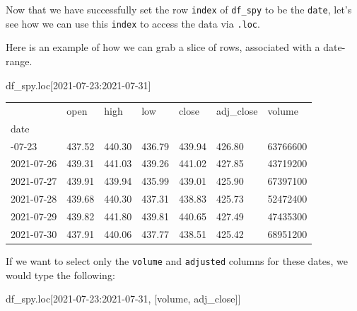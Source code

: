 \documentclass[
  letterpaper,
  DIV=11,
  numbers=noendperiod]{scrreprt}
\newenvironment{Shaded}{\begin{snugshade}}{\end{snugshade}}
\newcommand{\NormalTok}[1]{\textcolor[rgb]{0.00,0.23,0.31}{#1}}
\newcommand{\StringTok}[1]{\textcolor[rgb]{0.13,0.47,0.30}{#1}}
\begin{document}
Now that we have successfully set the row \texttt{index} of
\texttt{df\_spy} to be the \texttt{date}, let's see how we can use this
\texttt{index} to access the data via \texttt{.loc}.

Here is an example of how we can grab a slice of rows, associated with a
date-range.

\begin{Shaded}
\begin{Highlighting}[]
\NormalTok{df\_spy.loc[}\StringTok{\textquotesingle{}2021{-}07{-}23\textquotesingle{}}\NormalTok{:}\StringTok{\textquotesingle{}2021{-}07{-}31\textquotesingle{}}\NormalTok{]}
\end{Highlighting}
\end{Shaded}

\begin{longtable}[]{@{}lllllll@{}}
\toprule\noalign{}
& open & high & low & close & adj\_close & volume \\
date & & & & & & \\
\midrule\noalign{}
\endhead
\bottomrule\noalign{}
\endlastfoot
2021-07-23 & 437.52 & 440.30 & 436.79 & 439.94 & 426.80 & 63766600 \\
2021-07-26 & 439.31 & 441.03 & 439.26 & 441.02 & 427.85 & 43719200 \\
2021-07-27 & 439.91 & 439.94 & 435.99 & 439.01 & 425.90 & 67397100 \\
2021-07-28 & 439.68 & 440.30 & 437.31 & 438.83 & 425.73 & 52472400 \\
2021-07-29 & 439.82 & 441.80 & 439.81 & 440.65 & 427.49 & 47435300 \\
2021-07-30 & 437.91 & 440.06 & 437.77 & 438.51 & 425.42 & 68951200 \\
\end{longtable}

If we want to select only the \texttt{volume} and \texttt{adjusted}
columns for these dates, we would type the following:

\begin{Shaded}
\begin{Highlighting}[]
\NormalTok{df\_spy.loc[}\StringTok{\textquotesingle{}2021{-}07{-}23\textquotesingle{}}\NormalTok{:}\StringTok{\textquotesingle{}2021{-}07{-}31\textquotesingle{}}\NormalTok{, [}\StringTok{\textquotesingle{}volume\textquotesingle{}}\NormalTok{, }\StringTok{\textquotesingle{}adj\_close\textquotesingle{}}\NormalTok{]]}
\end{Highlighting}
\end{Shaded}
\end{document}
